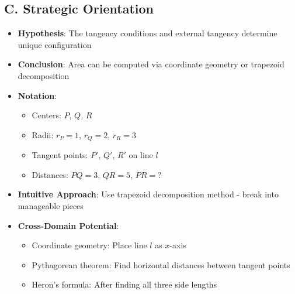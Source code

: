\documentclass[]{article}
\begin{document}
\begin{problemconfigbox}
\subsection*{C. Strategic Orientation}
\begin{itemize}[leftmargin=*]
    \item \textbf{Hypothesis}: The tangency conditions and external tangency determine unique configuration
    \item \textbf{Conclusion}: Area can be computed via coordinate geometry or trapezoid decomposition
    \item \textbf{Notation}: 
    \begin{itemize}
        \item Centers: $P$, $Q$, $R$
        \item Radii: $r_P = 1$, $r_Q = 2$, $r_R = 3$
        \item Tangent points: $P'$, $Q'$, $R'$ on line $l$
        \item Distances: $PQ = 3$, $QR = 5$, $PR = ?$
    \end{itemize}
    \item \textbf{Intuitive Approach}: Use trapezoid decomposition method - break into manageable pieces
    \item \textbf{Cross-Domain Potential}: 
    \begin{itemize}
        \item Coordinate geometry: Place line $l$ as $x$-axis
        \item Pythagorean theorem: Find horizontal distances between tangent points
        \item Heron's formula: After finding all three side lengths
    \end{itemize}
\end{itemize}
\end{problemconfigbox}
\end{document}
